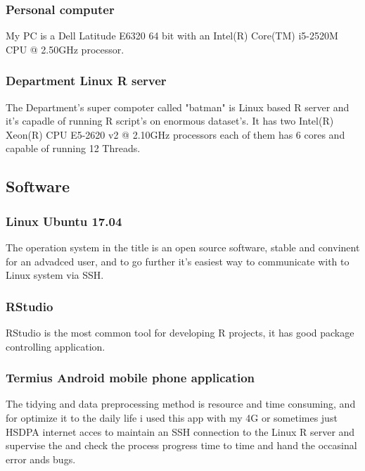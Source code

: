 			\subsubsection{Personal computer}
My PC is a Dell Latitude E6320 64 bit with an Intel(R) Core(TM) i5-2520M CPU @ 2.50GHz processor.
\cite{Latitude}
			\subsubsection{Department Linux R server}
The Department's super compoter called "batman" is Linux based R server and it's capadle of running R script's on enormous dataset's. It has two Intel(R) Xeon(R) CPU E5-2620 v2 @ 2.10GHz processors each of them has 6 cores and capable of running 12 Threads.
\cite{Batman}
		\subsection{Software}
			\subsubsection{Linux Ubuntu 17.04}
The operation system in the title is an open source software, stable and convinent for an advadced user, and to go further it's easiest way to communicate with to Linux system via SSH.
\cite{Ubuntu}
			\subsubsection{RStudio}
RStudio is the most common tool for developing R projects, it has good package controlling application.
\cite{RStudio}
			\subsubsection{Termius Android mobile phone application}
The tidying and data preprocessing method is resource and time consuming, and for optimize it to the daily life i used this app with my 4G or sometimes just HSDPA internet acces to maintain an SSH connection to the Linux R server and supervise the and check the process progress time to time and hand the occasinal error ands bugs.
\cite{Termius}
